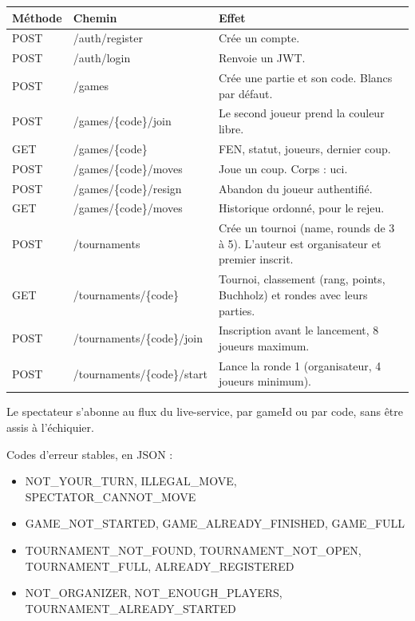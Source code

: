 \documentclass[11pt,a4paper]{article}
\newcommand{\field}[1]{{\ttfamily #1}}
\begin{document}
\begin{tabularx}{\linewidth}{@{}p{2.05cm} L L@{}}
\toprule
Méthode & Chemin & Effet \\
\midrule
POST & \field{/auth/register} & Crée un compte. \\
POST & \field{/auth/login} & Renvoie un JWT. \\
POST & \field{/games} & Crée une partie et son code. Blancs par défaut. \\
POST & \field{/games/\{code\}/\allowbreak join} & Le second joueur prend la couleur libre. \\
GET & \field{/games/\{code\}} & FEN, statut, joueurs, dernier coup. \\
POST & \field{/games/\{code\}/\allowbreak moves} & Joue un coup. Corps : \field{uci}. \\
POST & \field{/games/\{code\}/\allowbreak resign} & Abandon du joueur authentifié. \\
GET & \field{/games/\{code\}/\allowbreak moves} & Historique ordonné, pour le rejeu. \\
POST & \field{/tournaments} & Crée un tournoi (\field{name}, \field{rounds} de 3 à 5). L'auteur est organisateur et premier inscrit. \\
GET & \field{/tournaments/\{code\}} & Tournoi, classement (rang, points, Buchholz) et rondes avec leurs parties. \\
POST & \field{/tournaments/\{code\}/\allowbreak join} & Inscription avant le lancement, 8 joueurs maximum. \\
POST & \field{/tournaments/\{code\}/\allowbreak start} & Lance la ronde 1 (organisateur, 4 joueurs minimum). \\
\bottomrule
\end{tabularx}

\vspace{4pt}
Le spectateur s'abonne au flux du \field{live-service}, par \field{gameId} ou par code, sans être assis à l'échiquier.

Codes d'erreur stables, en JSON :

\begin{itemize}
  \item \field{NOT\_YOUR\_TURN}, \field{ILLEGAL\_MOVE}, \field{SPECTATOR\_CANNOT\_MOVE}
  \item \field{GAME\_NOT\_STARTED}, \field{GAME\_ALREADY\_FINISHED}, \field{GAME\_FULL}
  \item \field{TOURNAMENT\_NOT\_FOUND}, \field{TOURNAMENT\_NOT\_OPEN}, \field{TOURNAMENT\_FULL}, \field{ALREADY\_REGISTERED}
  \item \field{NOT\_ORGANIZER}, \field{NOT\_ENOUGH\_PLAYERS}, \field{TOURNAMENT\_ALREADY\_STARTED}
\end{itemize}
\end{document}
